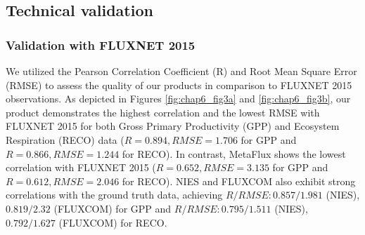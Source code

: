 \subsection{Technical validation}
\subsubsection{Validation with FLUXNET 2015}
We utilized the Pearson Correlation Coefficient (R) and Root Mean Square Error (RMSE) to assess the quality of our products in comparison to FLUXNET 2015 observations. As depicted in Figures \ref{fig:chap6_fig3a} and \ref{fig:chap6_fig3b}, our product demonstrates the highest correlation and the lowest RMSE with FLUXNET 2015 for both Gross Primary Productivity (GPP) and Ecosystem Respiration (RECO) data ($R = 0.894, RMSE = 1.706$ for GPP and $R = 0.866, RMSE = 1.244$ for RECO). In contrast, MetaFlux shows the lowest correlation with FLUXNET 2015 ($R = 0.652, RMSE = 3.135$ for GPP and $R = 0.612, RMSE = 2.046$ for RECO). NIES and FLUXCOM also exhibit strong correlations with the ground truth data, achieving $R/RMSE: 0.857/1.981$ (NIES), $0.819/2.32$ (FLUXCOM) for GPP and $R/RMSE: 0.795/1.511$ (NIES), $0.792/1.627$ (FLUXCOM) for RECO. \par

